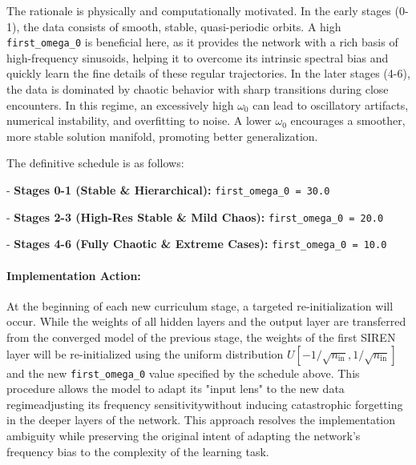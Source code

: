 The rationale is physically and computationally motivated. In the early stages (0-1), the data consists of smooth, stable, quasi-periodic orbits. A high \texttt{first\_omega\_0} is beneficial here, as it provides the network with a rich basis of high-frequency sinusoids, helping it to overcome its intrinsic spectral bias and quickly learn the fine details of these regular trajectories. In the later stages (4-6), the data is dominated by chaotic behavior with sharp transitions during close encounters. In this regime, an excessively high $\omega_0$ can lead to oscillatory artifacts, numerical instability, and overfitting to noise. A lower $\omega_0$ encourages a smoother, more stable solution manifold, promoting better generalization.

The definitive schedule is as follows:


- \textbf{Stages 0-1 (Stable \& Hierarchical):} \texttt{first\_omega\_0 = 30.0}

- \textbf{Stages 2-3 (High-Res Stable \& Mild Chaos):} \texttt{first\_omega\_0 = 20.0}

- \textbf{Stages 4-6 (Fully Chaotic \& Extreme Cases):} \texttt{first\_omega\_0 = 10.0}


\paragraph{Implementation Action:}
At the beginning of each new curriculum stage, a targeted re-initialization will occur. While the weights of all hidden layers and the output layer are transferred from the converged model of the previous stage, the weights of the first SIREN layer will be re-initialized using the uniform distribution $U[-1/\sqrt{n_{\text{in}}}, 1/\sqrt{n_{\text{in}}}]$ and the new \texttt{first\_omega\_0} value specified by the schedule above. This procedure allows the model to adapt its "input lens" to the new data regime\textemdash adjusting its frequency sensitivity\textemdash without inducing catastrophic forgetting in the deeper layers of the network. This approach resolves the implementation ambiguity while preserving the original intent of adapting the network's frequency bias to the complexity of the learning task.

